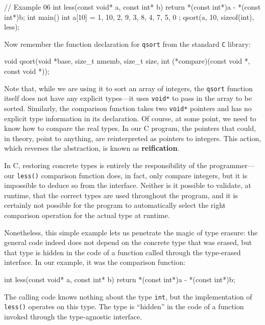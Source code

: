 \begin{code}
// Example 06
int less(const void* a, const int* b) {
  return *(const int*)a - *(const int*)b;
}
int main() {
  int a[10] = { 1, 10, 2, 9, 3, 8, 4, 7, 5, 0 };
  qsort(a, 10, sizeof(int), less);
}
\end{code}

Now remember the function declaration for \texttt{qsort} from the standard \texttt{C} library:

\begin{code}
void qsort(void *base, size_t nmemb, size_t size,
  int (*compare)(const void *, const void *));
\end{code}

Note that, while we are using it to sort an array of integers, the \texttt{qsort} function itself does not have any explicit types---it uses \texttt{void*} to pass in the array to be sorted. Similarly, the comparison function takes two \texttt{void*} pointers and has no explicit type information in its declaration. Of course, at some point, we need to know how to compare the real types. In our C program, the pointers that could, in theory, point to anything, are reinterpreted as pointers to integers. This action, which reverses the abstraction, is known as \textbf{reification}.

In C, restoring concrete types is entirely the responsibility of the programmer---our \texttt{less()} comparison function does, in fact, only compare integers, but it is impossible to deduce so from the interface. Neither is it possible to validate, at runtime, that the correct types are used throughout the program, and it is certainly not possible for the program to automatically select the right comparison operation for the actual type at runtime.

Nonetheless, this simple example lets us penetrate the magic of type erasure: the general code indeed does not depend on the concrete type that was erased, but that type is hidden in the code of a function called through the type-erased interface. In our example, it was the comparison function:

\begin{code}
int less(const void* a, const int* b) {
  return *(const int*)a - *(const int*)b;
}
\end{code}

The calling code knows nothing about the type \texttt{int}, but the implementation of \texttt{less()} operates on this type. The type is ``hidden'' in the code of a function invoked through the type-agnostic interface.

